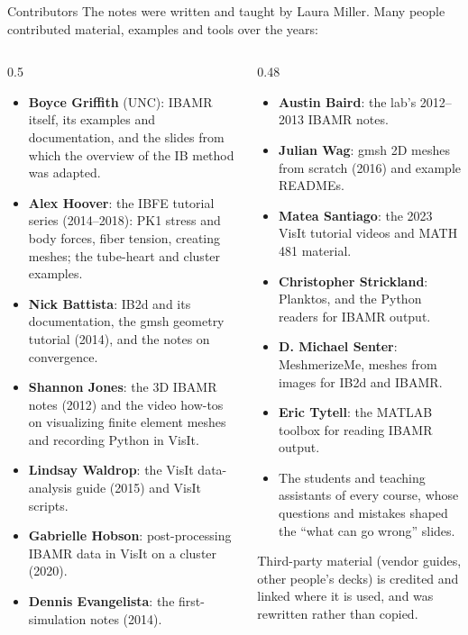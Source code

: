 \documentclass[aspectratio=169,11pt]{beamer}
\begin{document}
\begin{frame}{Contributors}
\footnotesize The notes were written and taught by Laura Miller. Many people contributed material, examples and tools over the years:
\scriptsize
\begin{columns}[T,onlytextwidth]
\begin{column}{0.5\textwidth}
\begin{itemize}\setlength{\itemsep}{0pt}
  \item \textbf{Boyce Griffith} (UNC): IBAMR itself, its examples and documentation, and the slides from which the overview of the IB method was adapted.
  \item \textbf{Alex Hoover}: the IBFE tutorial series (2014--2018): PK1 stress and body forces, fiber tension, creating meshes; the tube-heart and cluster examples.
  \item \textbf{Nick Battista}: IB2d and its documentation, the gmsh geometry tutorial (2014), and the notes on convergence.
  \item \textbf{Shannon Jones}: the 3D IBAMR notes (2012) and the video how-tos on visualizing finite element meshes and recording Python in VisIt.
  \item \textbf{Lindsay Waldrop}: the VisIt data-analysis guide (2015) and VisIt scripts.
  \item \textbf{Gabrielle Hobson}: post-processing IBAMR data in VisIt on a cluster (2020).
  \item \textbf{Dennis Evangelista}: the first-simulation notes (2014).
\end{itemize}
\end{column}
\begin{column}{0.48\textwidth}
\begin{itemize}\setlength{\itemsep}{0pt}
  \item \textbf{Austin Baird}: the lab's 2012--2013 IBAMR notes.
  \item \textbf{Julian Wag}: gmsh 2D meshes from scratch (2016) and example READMEs.
  \item \textbf{Matea Santiago}: the 2023 VisIt tutorial videos and MATH 481 material.
  \item \textbf{Christopher Strickland}: Planktos, and the Python readers for IBAMR output.
  \item \textbf{D. Michael Senter}: MeshmerizeMe, meshes from images for IB2d and IBAMR.
  \item \textbf{Eric Tytell}: the MATLAB toolbox for reading IBAMR output.
  \item The students and teaching assistants of every course, whose questions and mistakes shaped the ``what can go wrong'' slides.
\end{itemize}
Third-party material (vendor guides, other people's decks) is credited and linked where it is used, and was rewritten rather than copied.
\end{column}
\end{columns}
\end{frame}
\end{document}
